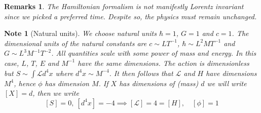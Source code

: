 \documentclass[a4paper]{article}
\newtheorem{remarks}{Remarks}[section]
\newtheorem{note}{Note}[section]
\theoremstyle{new}
\begin{document}
\begin{remarks}
The Hamiltonian formalism is not manifestly Lorentz invariant since we picked a preferred time. Despite so, the physics must remain unchanged.
\end{remarks}
\begin{note}[Natural units]
We choose natural units $\hbar=1$, $G=1$ and $c=1$. The dimensional units of the natural constants are $c\sim LT^{-1}$, $\hbar\sim L^2MT^{-1}$ and $G\sim L^3M^{-1}T^{-2}$. All quantities scale with some power of mass and energy. In this case, $L$, $T$, $E$ and $M^{-1}$ have the same dimensions. The action is dimensionless but $S\sim\int\mathcal{L}d^4x$ where $d^4x\sim M^{-4}$. It then follows that $\mathcal{L}$ and $H$ have dimensions $M^4$, hence $\phi$ has dimension $M$. If $X$ has dimensions of (mass) $d$ we will write $[X] = d$, then we write
$$[S]=0,~[d^4x]=-4\implies [\mathcal{L}]=4=[H],\quad [\phi]=1$$
\end{note}
\newpage
\end{document}
